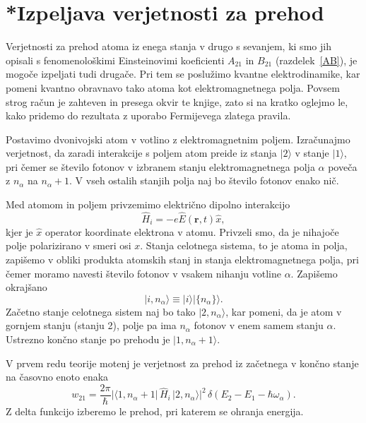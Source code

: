 \section{*Izpeljava verjetnosti za prehod}
\label{chap:verjetnost}
Verjetnosti za prehod atoma iz enega stanja v drugo s sevanjem, ki
smo jih opisali s fenomenološkimi Einsteinovimi koeficienti $A_{21}$
in $B_{21}$ (razdelek~\ref{AB}), 
je mogoče izpeljati tudi drugače.
Pri tem se poslužimo kvantne elektrodinamike, 
kar pomeni kvantno obravnavo 
tako atoma kot elektromagnetnega polja. Povsem strog račun je zahteven in presega
okvir te knjige, zato si na kratko oglejmo le, kako pridemo do rezultata z uporabo
Fermijevega zlatega pravila.

Postavimo dvonivojski atom v votlino z elektromagnetnim poljem.
Izračunajmo verjetnost, da zaradi interakcije s poljem atom
preide iz stanja $|2\rangle$ v stanje $|1\rangle$, pri čemer se
število fotonov v izbranem stanju elektromagnetnega polja $\alpha$
poveča z $n_{\alpha}$ na $n_{\alpha}+1$. V vseh ostalih stanjih
polja naj bo število fotonov enako nič.

Med atomom in poljem privzemimo električno dipolno interakcijo 
\begin{equation}
\hat{H}_{i}=-e\hat{E}(\mathbf{r},t)\hat{x},
\label{4.47}
\end{equation}
kjer je $\hat{x}$ operator koordinate elektrona v atomu. 
Privzeli
smo, da je nihajoče polje polarizirano v smeri osi $x$. Stanja celotnega sistema, 
to je atoma in polja, zapišemo v obliki produkta atomskih stanj in
stanja elektromagnetnega polja, pri čemer moramo navesti število fotonov
v vsakem nihanju votline $\alpha$. Zapišemo okrajšano
\begin{equation}
|i,n_{\alpha}\rangle\equiv|i\rangle|\{n_{\alpha}\}\rangle.
\label{4.48}
\end{equation}
Začetno stanje celotnega sistem naj bo tako $|2,n_{\alpha}\rangle$, kar pomeni, da je
atom v gornjem stanju (stanju 2), polje pa ima $n_{\alpha}$ fotonov v enem samem stanju $\alpha$.
Ustrezno končno stanje po prehodu je $|1,n_{\alpha}+1\rangle$.

V prvem redu teorije motenj je verjetnost za prehod iz začetnega v končno stanje
na časovno enoto enaka
\begin{equation}
w_{21}=\frac{2\pi}{\hbar}|\langle1,n_{\alpha}+
1|\,\hat{H}_{i}\,|2,n_{\alpha}\rangle|^{2}\,
\delta(E_{2}-E_{1}-\hbar\omega_{\alpha}).
\label{4.49}
\end{equation}
Z delta funkcijo izberemo le prehod, pri katerem se ohranja
energija.

